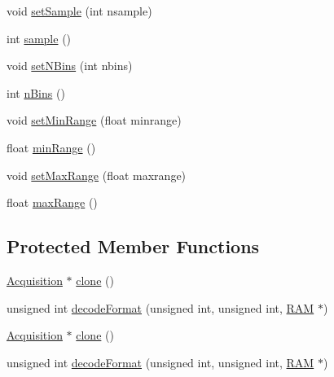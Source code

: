 \begin{DoxyCompactItemize}
void \hyperlink{classAcquisition_ade6fd6483b3e3737fe7dcdffb5065954}{set\+Sample} (int nsample)
\item 
int \hyperlink{classAcquisition_a83181975c0746e5837d53933031e7b62}{sample} ()
\item 
void \hyperlink{classAcquisition_a6ee040a009aa48f848b1e12434135db9}{set\+N\+Bins} (int nbins)
\item 
int \hyperlink{classAcquisition_a3a3dad0de9535d5a29c0810a5bdc3ae3}{n\+Bins} ()
\item 
void \hyperlink{classAcquisition_a8a15ffc6e539a3ae12efe4bea1ca7587}{set\+Min\+Range} (float minrange)
\item 
float \hyperlink{classAcquisition_a44f441710231748d2ca8f691647b2bcd}{min\+Range} ()
\item 
void \hyperlink{classAcquisition_a786da6cff5428020034be23e554e0e1b}{set\+Max\+Range} (float maxrange)
\item 
float \hyperlink{classAcquisition_a386f3ebc6b1d4956aa7e40b314ddb4eb}{max\+Range} ()
\end{DoxyCompactItemize}
\subsection*{Protected Member Functions}
\begin{DoxyCompactItemize}
\item 
\hyperlink{classAcquisition_1_1Acquisition}{Acquisition} $\ast$ \hyperlink{classAcquisition_a4b1b690ef27f20b3e1ad9383f2f57628}{clone} ()
\item 
unsigned int \hyperlink{classAcquisition_a76fe7c020f7097e5d479867ba783ba31}{decode\+Format} (unsigned int, unsigned int, \hyperlink{classRAM}{R\+AM} $\ast$)
\item 
\hyperlink{classAcquisition_1_1Acquisition}{Acquisition} $\ast$ \hyperlink{classAcquisition_a4b1b690ef27f20b3e1ad9383f2f57628}{clone} ()
\item 
unsigned int \hyperlink{classAcquisition_a76fe7c020f7097e5d479867ba783ba31}{decode\+Format} (unsigned int, unsigned int, \hyperlink{classRAM}{R\+AM} $\ast$)
\end{DoxyCompactItemize}
